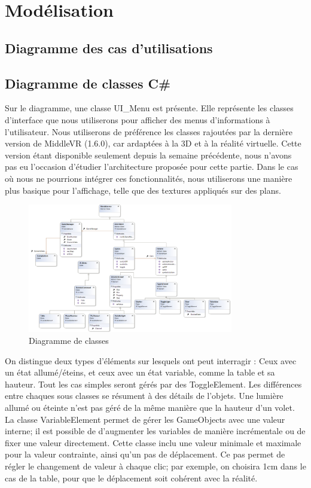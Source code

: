 \section{Modélisation}

\subsection{Diagramme des cas d’utilisations}


\subsection{Diagramme de classes C\#}

Sur le diagramme, une classe UI_Menu est présente. Elle représente les classes d'interface que nous utiliserons pour afficher des menus d'informations à l'utilisateur.
Nous utiliserons de préférence les classes rajoutées par la dernière version de MiddleVR (1.6.0), car ardaptées à la 3D et à la réalité virtuelle.
Cette version étant disponible seulement depuis la semaine précédente, nous n'avons pas eu l'occasion d'étudier l'architecture proposée pour cette partie.
Dans le cas où nous ne pourrions intégrer ces fonctionnalités, nous utiliserons une manière plus basique pour l'affichage, telle que des textures appliqués sur des plans.

\begin{figure}[p]
    \centering
    \includegraphics[width=0.8\textwidth]{img/diagClasses.png}
    \caption{Diagramme de classes}
    \label{fig:class_diagram}
\end{figure}
 
On distingue deux types d'éléments sur lesquels ont peut interragir : Ceux avec un état allumé/éteins, et ceux avec un état variable, comme la table et sa hauteur.
Tout les cas simples seront gérés par des ToggleElement. Les différences entre chaques sous classes se résument à des détails de l'objets.
Une lumière allumé ou éteinte n'est pas géré de la même manière que la hauteur d'un volet.
La classe VariableElement permet de gérer les GameObjects avec une valeur interne; il est possible de d'augmenter les variables de manière incrémentale ou de fixer une valeur directement.
Cette classe inclu une valeur minimale et maximale pour la valeur contrainte, ainsi qu'un pas de déplacement.
Ce pas permet de régler le changement de valeur à chaque clic; par exemple, on choisira 1cm dans le cas de la table, pour que le déplacement soit cohérent avec la réalité.

